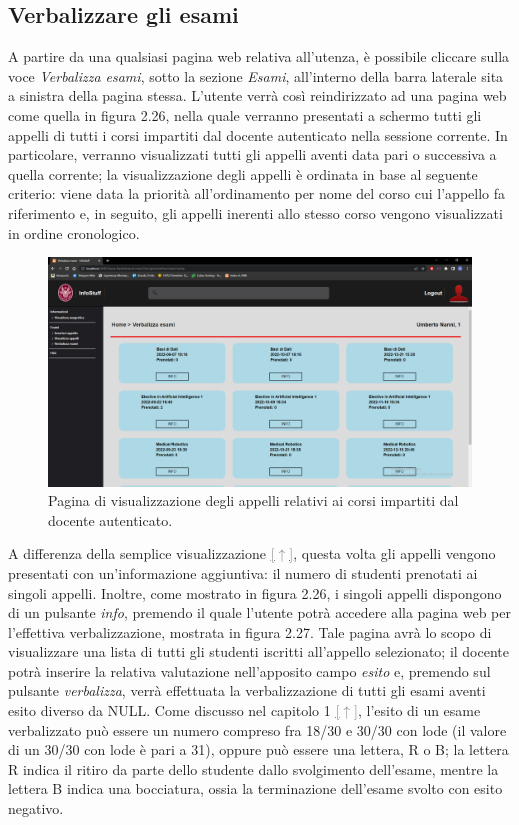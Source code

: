\documentclass [a4paper,11pt]{book}
\begin{document}
\medskip

\subsection{Verbalizzare gli esami}

A partire da una qualsiasi pagina web relativa all'utenza, è possibile cliccare sulla voce \emph{Verbalizza esami}, sotto la sezione \emph{Esami}, all'interno della barra laterale sita a sinistra della pagina stessa. L'utente verrà così reindirizzato ad una pagina web come quella in figura 2.26, nella quale verranno presentati a schermo tutti gli appelli di tutti i corsi impartiti dal docente autenticato nella sessione corrente. In particolare, verranno visualizzati tutti gli appelli aventi data pari o successiva a quella corrente; la visualizzazione degli appelli è ordinata in base al seguente criterio: viene data la priorità all'ordinamento per nome del corso cui l'appello fa riferimento e, in seguito, gli appelli inerenti allo stesso corso vengono visualizzati in ordine cronologico.

\begin{figure}
\centering
\includegraphics[scale=0.3]{figura2-26.png}
\caption{Pagina di visualizzazione degli appelli relativi ai corsi impartiti dal docente autenticato.}
\end{figure}

A differenza della semplice visualizzazione \hyperref[sec:visualizzaAppelli]{\textcolor{gray}{[$\uparrow$]}}, questa volta gli appelli vengono presentati con un'informazione aggiuntiva: il numero di studenti prenotati ai singoli appelli. Inoltre, come mostrato in figura 2.26, i singoli appelli dispongono di un pulsante \emph{info}, premendo il quale l'utente potrà accedere alla pagina web per l'effettiva verbalizzazione, mostrata in figura 2.27. Tale pagina avrà lo scopo di visualizzare una lista di tutti gli studenti iscritti all'appello selezionato; il docente potrà inserire la relativa valutazione nell'apposito campo \emph{esito} e, premendo sul pulsante \emph{verbalizza}, verrà effettuata la verbalizzazione di tutti gli esami aventi esito diverso da NULL. Come discusso nel capitolo 1 \hyperref[sec:specifiche]{\textcolor{gray}{[$\uparrow$]}}, l'esito di un esame verbalizzato può essere un numero compreso fra 18/30 e 30/30 con lode (il valore di un 30/30 con lode è pari a 31), oppure può essere una lettera, R o B; la lettera R indica il ritiro da parte dello studente dallo svolgimento dell'esame, mentre la lettera B indica una bocciatura, ossia la terminazione dell'esame svolto con esito negativo.
\end{document}
